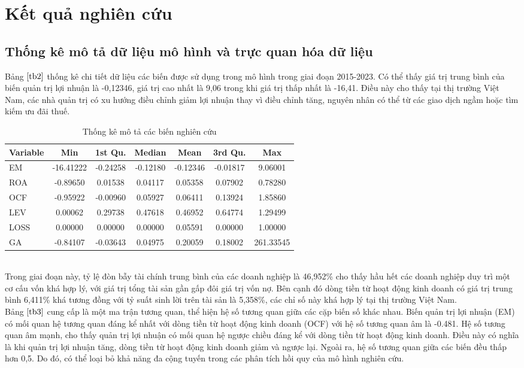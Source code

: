 \documentclass[a4paper]{article}
\begin{document}
\section{Kết quả nghiên cứu}
\subsection{Thống kê mô tả dữ liệu mô hình và trực quan hóa dữ liệu}
Bảng $\ref{tb2}$ thống kê chi tiết dữ liệu các biến được sử dụng trong mô hình trong giai đoạn 2015-2023. Có thể thấy giá trị trung bình của biến quản trị lợi nhuận là -0,12346, giá trị cao nhất là 9,06 trong khi giá trị thấp nhất là -16,41. Điều này cho thấy tại thị trường Việt Nam, các nhà quản trị có xu hướng điều chỉnh giảm lợi nhuận thay vì điều chỉnh tăng, nguyên nhân có thể từ các giao dịch ngầm hoặc tìm kiếm ưu đãi thuế.\\
\begin{table}[h!]
\centering\caption{Thống kê mô tả các biến nghiên cứu}
\label{tb2}
\begin{tabular}{lcccccc}
\toprule
Variable & Min & 1st Qu. & Median & Mean & 3rd Qu. & Max \\
\midrule
EM & -16.41222 & -0.24258 & -0.12180 & -0.12346 & -0.01817 & 9.06001 \\
ROA & -0.89650 & 0.01538 & 0.04117 & 0.05358 & 0.07902 & 0.78280 \\
OCF & -0.95922 & -0.00960 & 0.05927 & 0.06411 & 0.13924 & 1.85860 \\
LEV & 0.00062 & 0.29738 & 0.47618 & 0.46952 & 0.64774 & 1.29499 \\
LOSS & 0.00000 & 0.00000 & 0.00000 & 0.05591 & 0.00000 & 1.00000 \\
GA & -0.84107 & -0.03643 & 0.04975 & 0.20059 & 0.18002 & 261.33545 \\
\bottomrule
\end{tabular}
\end{table} \\
\indent Trong giai đoạn này, tỷ lệ đòn bẫy tài chính trung bình của các doanh nghiệp là 46,952\% cho thấy hầu hết các doanh nghiệp duy trì một cơ cấu vốn khá hợp lý, với giá trị tổng tài sản gần gấp đôi giá trị vốn nợ. Bên cạnh đó dòng tiền từ hoạt động kinh doanh có giá trị trung bình 6,411\% khá tương đồng với tỷ suất sinh lời trên tài sản là 5,358\%, các chỉ số này khá hợp lý tại thị trường Việt Nam.\\
\indent Bảng $\ref{tb3}$ cung cấp là một ma trận tương quan, thể hiện hệ số tương quan giữa các cặp biến số khác nhau. Biến quản trị lợi nhuận (EM) có mối quan hệ tương quan đáng kể nhất với dòng tiền từ hoạt động kinh doanh (OCF) với hệ số tương quan âm là -0.481. Hệ số tương quan âm mạnh, cho thấy quản trị lợi nhuận có mối quan hệ ngược chiều đáng kể với dòng tiền từ hoạt động kinh doanh. Điều này có nghĩa là khi quản trị lợi nhuận tăng, dòng tiền từ hoạt động kinh doanh giảm và ngược lại. Ngoài ra, hệ số tương quan giữa các biến đều thấp hơn 0,5. Do đó, có thể loại bỏ khả năng đa cộng tuyến trong các phân tích hồi quy của mô hình nghiên cứu.
\end{document}
